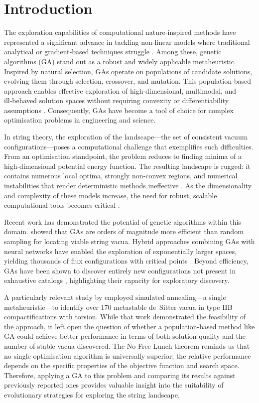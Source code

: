 \documentclass[runningheads]{llncs}
\begin{document}
%
\section{Introduction}

The exploration capabilities of computational nature‑inspired
methods have represented a significant advance in tackling
non‑linear models where traditional analytical or
gradient‑based techniques struggle \cite{Yang2020a,Ma2023}.
Among these, genetic algorithms (GA) stand out as a robust and
widely applicable metaheuristic. Inspired by natural selection,
GAs operate on populations of candidate solutions, evolving
them through selection, crossover, and mutation. This
population‑based approach enables effective exploration of
high‑dimensional, multimodal, and ill‑behaved solution spaces
without requiring convexity or differentiability assumptions
\cite{Yang2017,Eiben2015}. Consequently, GAs have become a
tool of choice for complex optimisation problems in
engineering and science.

In string theory, the exploration of the landscape—the set of
consistent vacuum configurations—poses a computational
challenge that exemplifies such difficulties. From an
optimisation standpoint, the problem reduces to finding minima
of a high‑dimensional potential energy function. The resulting
landscape is rugged: it contains numerous local optima,
strongly non‑convex regions, and numerical instabilities that
render deterministic methods ineffective \cite{Lanza2025,DeLuca2025}.
As the dimensionality and complexity of these models increase,
the need for robust, scalable computational tools becomes
critical \cite{Wilson2014}.

Recent work has demonstrated the potential of genetic
algorithms within this domain. \cite{Abel2014} showed that GAs
are orders of magnitude more efficient than random sampling for
locating viable string vacua. Hybrid approaches combining GAs
with neural networks have enabled the exploration of
exponentially larger spaces, yielding thousands of flux
configurations with critical points \cite{Bizet2020}. Beyond
efficiency, GAs have been shown to discover entirely new
configurations not present in exhaustive catalogs \cite{He2025},
highlighting their capacity for exploratory discovery.

A particularly relevant study by \cite{Damian2022} employed
simulated annealing—a single metaheuristic—to identify over
170 metastable de~Sitter vacua in type IIB compactifications
with torsion. While that work demonstrated the feasibility of
the approach, it left open the question of whether a
population‑based method like GA could achieve better
performance in terms of both solution quality and the number of
stable vacua discovered. The No Free Lunch theorem \cite{Wolpert1997}
reminds us that no single optimisation algorithm is universally
superior; the relative performance depends on the specific
properties of the objective function and search space.
Therefore, applying a GA to this problem and comparing its
results against previously reported ones provides valuable
insight into the suitability of evolutionary strategies for
exploring the string landscape.
\end{document}
